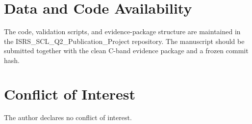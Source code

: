 \documentclass[journal]{IEEEtran}
\begin{document}
\section*{Data and Code Availability}
The code, validation scripts, and evidence-package structure are maintained in the ISRS\_SCL\_Q2\_Publication\_Project repository. The manuscript should be submitted together with the clean C-band evidence package and a frozen commit hash.

\section*{Conflict of Interest}
The author declares no conflict of interest.



\end{document}
